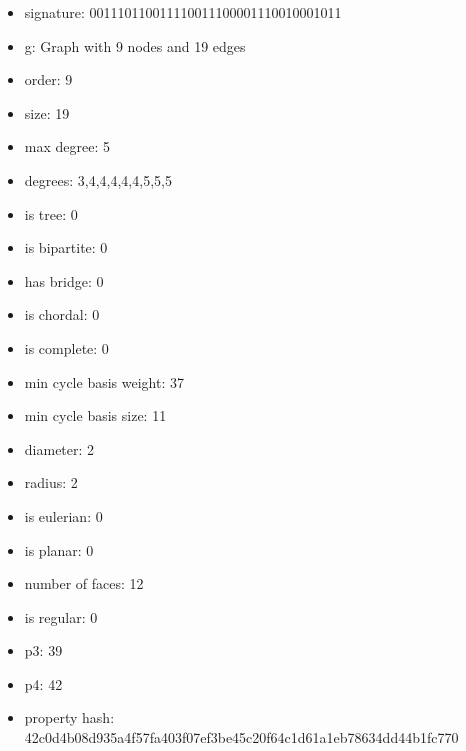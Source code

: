 \newpage
\begin{figure}
\end{figure}
\begin{itemize}
\item signature: 001110110011110011100001110010001011
\item g: Graph with 9 nodes and 19 edges
\item order: 9
\item size: 19
\item max degree: 5
\item degrees: 3,4,4,4,4,4,5,5,5
\item is tree: 0
\item is bipartite: 0
\item has bridge: 0
\item is chordal: 0
\item is complete: 0
\item min cycle basis weight: 37
\item min cycle basis size: 11
\item diameter: 2
\item radius: 2
\item is eulerian: 0
\item is planar: 0
\item number of faces: 12
\item is regular: 0
\item p3: 39
\item p4: 42
\item property hash: 42c0d4b08d935a4f57fa403f07ef3be45c20f64c1d61a1eb78634dd44b1fc770
\end{itemize}
